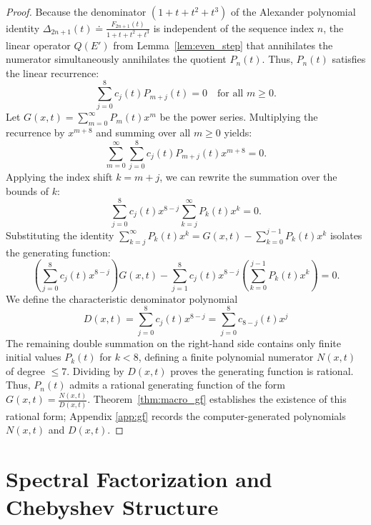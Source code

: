 \documentclass[11pt]{article}
\begin{document}
\begin{proof}
Because the denominator $(1+t+t^2+t^3)$ of the Alexander polynomial identity $\Delta_{2n+1}(t) \doteq \frac{F_{2n+1}(t)}{1+t+t^2+t^3}$ is independent of the sequence index $n$, the linear operator $Q(E')$ from Lemma~\ref{lem:even_step} that annihilates the numerator simultaneously annihilates the quotient $P_n(t)$. Thus, $P_n(t)$ satisfies the linear recurrence:
\begin{equation*}
\sum_{j=0}^8 c_j(t) P_{m+j}(t) = 0 \quad \text{for all } m \ge 0.
\end{equation*}
Let $G(x,t) = \sum_{m=0}^\infty P_m(t) x^m$ be the power series. Multiplying the recurrence by $x^{m+8}$ and summing over all $m \ge 0$ yields:
\begin{equation*}
\sum_{m=0}^\infty \sum_{j=0}^8 c_j(t) P_{m+j}(t) x^{m+8} = 0.
\end{equation*}
Applying the index shift $k = m+j$, we can rewrite the summation over the bounds of $k$:
\begin{equation*}
\sum_{j=0}^8 c_j(t) x^{8-j} \sum_{k=j}^\infty P_k(t) x^k = 0.
\end{equation*}
Substituting the identity $\sum_{k=j}^\infty P_k(t) x^k = G(x,t) - \sum_{k=0}^{j-1} P_k(t) x^k$ isolates the generating function:
\begin{equation*}
\left( \sum_{j=0}^8 c_j(t) x^{8-j} \right) G(x,t) - \sum_{j=1}^8 c_j(t) x^{8-j} \left( \sum_{k=0}^{j-1} P_k(t) x^k \right) = 0.
\end{equation*}
We define the characteristic denominator polynomial 
\begin{equation*}
    D(x,t) = \sum_{j=0}^8 c_j(t) x^{8-j} = \sum_{j=0}^8 c_{8-j}(t) x^j
\end{equation*}
The remaining double summation on the right-hand side contains only finite initial values $P_k(t)$ for $k < 8$, defining a finite polynomial numerator $N(x,t)$ of degree $\le 7$. Dividing by $D(x,t)$ proves the generating function is rational. Thus, $P_n(t)$ admits a rational generating function of the form $G(x,t) = \frac{N(x,t)}{D(x,t)}$. Theorem~\ref{thm:macro_gf} establishes the existence of this rational form; Appendix \ref{app:gf} records the computer-generated polynomials $N(x,t)$ and $D(x,t)$.
\end{proof}

\section{Spectral Factorization and Chebyshev Structure} \label{sec:SpecFactrz&Chebyshev}
\end{document}
